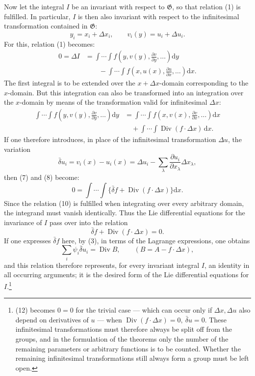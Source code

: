 \documentclass[11pt]{article}
\newcommand{\D}{\Delta}
\providecommand{\dd}{\mathrm d}
\providecommand{\Div}{\operatorname{Div}}
\providecommand{\G}{\mathfrak G}
\providecommand{\bd}{\bar{\delta}}
\providecommand{\p}{\partial}
\begin{document}
Now let the integral \(I\) be an invariant with respect to \(\G\), so that relation (1) is fulfilled. In particular, \(I\) is then also invariant with respect to the infinitesimal transformation contained in \(\G\):
\[
y_i=x_i+\D x_i,\qquad v_i(y)=u_i+\D u_i.
\]
For this, relation (1) becomes:
\begin{equation}
\begin{aligned}
0=\D I
&=\int\!\cdots\!\int f\!\left(y,v(y),\frac{\p v}{\p y},\ldots\right)\dd y\\
&\qquad-\int\!\cdots\!\int f\!\left(x,u(x),\frac{\p u}{\p x},\ldots\right)\dd x.
\end{aligned}
\tag{7}
\end{equation}
The first integral is to be extended over the \(x+\D x\)-domain corresponding to the \(x\)-domain. But this integration can also be transformed into an integration over the \(x\)-domain by means of the transformation valid for infinitesimal \(\D x\):
\begin{equation}
\begin{aligned}
\int\!\cdots\!\int f\!\left(y,v(y),\frac{\p v}{\p y},\ldots\right)\dd y
&=\int\!\cdots\!\int f\!\left(x,v(x),\frac{\p v}{\p x},\ldots\right)\dd x\\
&\quad+\int\!\cdots\!\int \Div(f\cdot \D x)\,\dd x.
\end{aligned}
\tag{8}
\end{equation}
If one therefore introduces, in place of the infinitesimal transformation \(\D u\), the variation
\begin{equation}
\bd u_i=v_i(x)-u_i(x)=\D u_i-\sum_\lambda\frac{\p u_i}{\p x_\lambda}\D x_\lambda,
\tag{9}
\end{equation}
then (7) and (8) become:
\begin{equation}
0=\int\!\cdots\!\int\{\bd f+\Div(f\cdot\D x)\}\dd x.
\tag{10}
\end{equation}
Since the relation (10) is fulfilled when integrating over every arbitrary domain, the integrand must vanish identically. Thus the Lie differential equations for the invariance of \(I\) pass over into the relation
\begin{equation}
\bd f+\Div(f\cdot\D x)=0.
\tag{11}
\end{equation}
If one expresses \(\bd f\) here, by (3), in terms of the Lagrange expressions, one obtains
\begin{equation}
\sum_i\psi_i\bd u_i=\Div B,\qquad (B=A-f\cdot\D x),
\tag{12}
\end{equation}
and this relation therefore represents, for every invariant integral \(I\), an identity in all occurring arguments; it is the desired form of the Lie differential equations for \(I\).\footnote{(12) becomes \(0=0\) for the trivial case --- which can occur only if \(\D x,\D u\) also depend on derivatives of \(u\) --- when \(\Div(f\cdot\D x)=0,\ \bd u=0\). These infinitesimal transformations must therefore always be split off from the groups, and in the formulation of the theorems only the number of the remaining parameters or arbitrary functions is to be counted. Whether the remaining infinitesimal transformations still always form a group must be left open.}
\end{document}

